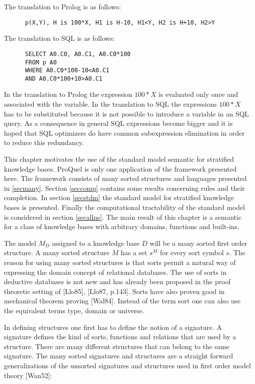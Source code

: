 The translation to Prolog is as follows:

\begin{verbatim}
      p(X,Y), H is 100*X, H1 is H-10, H1<Y, H2 is H+10, H2>Y
\end{verbatim}

The translation to SQL is as follows:

\begin{verbatim}
      SELECT A0.C0, A0.C1, A0.C0*100
      FROM p A0
      WHERE A0.C0*100-10<A0.C1
      AND A0.C0*100+10>A0.C1
\end{verbatim}

In the translation to Prolog the expression $100\!*\!X$ is evaluated only once and associated
with the variable. In the translation to SQL the expressions $100\!*\!X$ has to be substituted 
because it is not possible to introduce a variable in an SQL query. As a consequence in
general SQL expressions become bigger and it is hoped that SQL optimizers do have common 
subexpression elimination in order to reduce this redundancy.

\label{chapsem}
This chapter motivates the use of the standard model semantic for stratified knowledge bases. 
ProQuel is only one application of the framework presented here. The framework consists
of many sorted structures and languages presented in \ref{secmany}. Section \ref{seccomp} 
contains some results concerning rules and their completion. In section \ref{secstdm} the standard 
model for stratified knowledge bases is presented. Finally the computational tractability of the 
standard model is considered in section \ref{secallns}. The main result of this chapter is a 
semantic for a class of knowledge bases with arbitrary domains, functions and built-ins.

\label{secmany}
The model $M_D$ assigned to a knowledge base $D$ will be a many sorted first order structure. A 
many sorted structure $M$ has a set $s^M$ for every sort symbol $s$. The reason for using 
many sorted structures is that sorts permit a natural way of expressing the domain concept of 
relational databases. The use of sorts in deductive databases is not new and has already 
been proposed in the proof theoretic setting of [Llo85], [Llo87, p.143]. Sorts have also proven 
good in mechanical theorem proving [Wal84]. Instead of the term sort one can also use the 
equivalent terms type, domain or universe.

In defining structures one first has to define the notion of a signature. A signature defines the
kind of sorts, functions and relations that are used by a structure. There are many different
structures that can belong to the same signature. The many sorted signatures and structures are 
a straight forward generalizations of the unsorted signatures and structures used in first order 
model theory [Wan52]:

